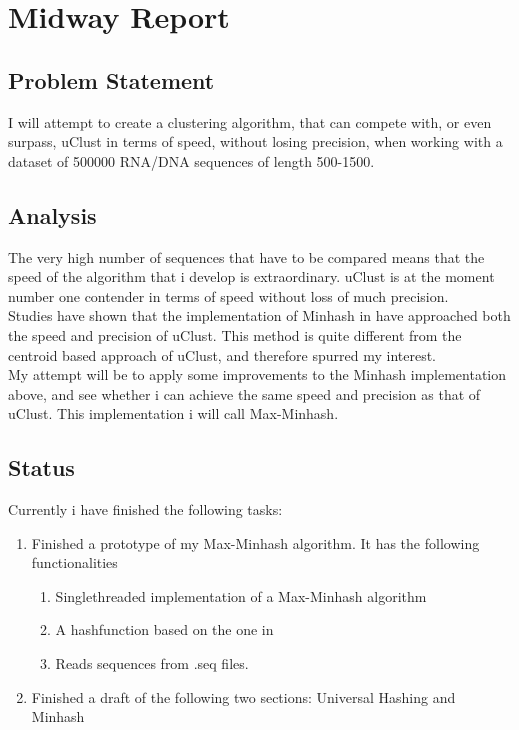\documentclass[../../main.tex]{subfiles}
\begin{document}
\section{Midway Report}

\subsection{Problem Statement}
I will attempt to create a clustering algorithm, that can compete with, or even surpass, uClust in terms of speed, without losing precision, when working with a dataset of 500000 RNA/DNA sequences of length 500-1500.

\subsection{Analysis}
The very high number of sequences that have to be compared means that the speed of the algorithm that i develop is extraordinary. uClust is at the moment number one contender in terms of speed without loss of much precision.\\

Studies have shown that the implementation of Minhash in \cite{MinhashMapreduce} have approached both the speed and precision of uClust. This method is quite different from the centroid based approach of uClust, and therefore spurred my interest.\\

My attempt will be to apply some improvements to the Minhash implementation above, and see whether i can achieve the same speed and precision as that of uClust. This implementation i will call Max-Minhash.

\subsection{Status}

Currently i have finished the following tasks:
\begin{enumerate}
\item Finished a prototype of my Max-Minhash algorithm. It has the following functionalities
\begin{enumerate}
\item Singlethreaded implementation of a Max-Minhash algorithm
\item A hashfunction based on the one in \cite{MinhashMapreduce}
\item Reads sequences from .seq files. 
\end{enumerate}
\item Finished a draft of the following two sections: Universal Hashing and Minhash
\end{enumerate}
\end{document}
